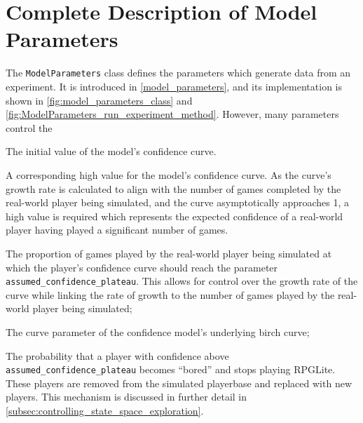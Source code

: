 \chapter{Complete Description of Model Parameters}
\label{appendix_model_parameters}

The \lstinline{ModelParameters} class defines the parameters which generate data
from an experiment. It is introduced in \cref{model_parameters}, and its
implementation is shown in \cref{fig:model_parameters_class} and
\cref{fig:ModelParameters_run_experiment_method}. However, many parameters
control the 

  

\begin{description}[style=multiline,leftmargin=3cm]
  \item[starting\\confidence] The initial value of the model's confidence curve.
  \item[assumed\\confidence\\plateau] A corresponding high value for the model's
  confidence curve. As the curve's growth rate is calculated to align with the
  number of games completed by the real-world player being simulated, and the
  curve asymptotically approaches 1, a high value is required which represents
  the expected confidence of a real-world player having played a significant
  number of games.
  \item[curve\\inflection\\relative to\\numgames] The proportion of games played by
  the real-world player being simulated at which the player's confidence
  curve should reach the parameter \lstinline{assumed_confidence_plateau}. This
  allows for control over the growth rate of the curve while linking the rate of
  growth to the number of games played by the real-world player being simulated;
  \item[C] The curve parameter of the confidence model's underlying birch curve;
  \item[prob\\bored] The probability that a player with confidence above
  \lstinline{assumed_confidence_plateau} becomes ``bored'' and stops playing
  RPGLite. These players are removed from the simulated playerbase and replaced
  with new players. This mechanism is discussed in further detail in
  \cref{subsec:controlling_state_space_exploration}.

\end{description}
